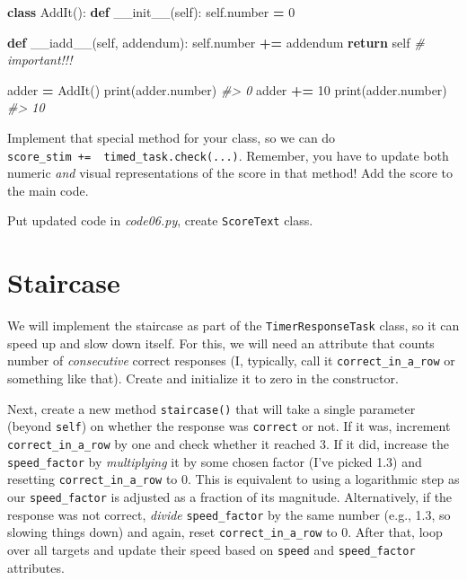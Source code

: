 \documentclass[
]{book}
\newenvironment{Shaded}{\begin{snugshade}}{\end{snugshade}}
\newcommand{\BuiltInTok}[1]{#1}
\newcommand{\CommentTok}[1]{\textcolor[rgb]{0.56,0.35,0.01}{\textit{#1}}}
\newcommand{\ControlFlowTok}[1]{\textcolor[rgb]{0.13,0.29,0.53}{\textbf{#1}}}
\newcommand{\DecValTok}[1]{\textcolor[rgb]{0.00,0.00,0.81}{#1}}
\newcommand{\FunctionTok}[1]{\textcolor[rgb]{0.00,0.00,0.00}{#1}}
\newcommand{\KeywordTok}[1]{\textcolor[rgb]{0.13,0.29,0.53}{\textbf{#1}}}
\newcommand{\NormalTok}[1]{#1}
\newcommand{\OperatorTok}[1]{\textcolor[rgb]{0.81,0.36,0.00}{\textbf{#1}}}
\newcommand{\VariableTok}[1]{\textcolor[rgb]{0.00,0.00,0.00}{#1}}
\begin{document}
\begin{Shaded}
\begin{Highlighting}[]
\KeywordTok{class}\NormalTok{ AddIt():}
    \KeywordTok{def} \FunctionTok{\_\_init\_\_}\NormalTok{(}\VariableTok{self}\NormalTok{):}
        \VariableTok{self}\NormalTok{.number }\OperatorTok{=} \DecValTok{0}
        
    \KeywordTok{def} \FunctionTok{\_\_iadd\_\_}\NormalTok{(}\VariableTok{self}\NormalTok{, addendum):}
        \VariableTok{self}\NormalTok{.number }\OperatorTok{+=}\NormalTok{ addendum}
        \ControlFlowTok{return} \VariableTok{self} \CommentTok{\# important!!!}


\NormalTok{adder }\OperatorTok{=}\NormalTok{ AddIt()}
\BuiltInTok{print}\NormalTok{(adder.number)}
\CommentTok{\#\textgreater{} 0}
\NormalTok{adder }\OperatorTok{+=} \DecValTok{10}
\BuiltInTok{print}\NormalTok{(adder.number)}
\CommentTok{\#\textgreater{} 10}
\end{Highlighting}
\end{Shaded}

Implement that special method for your class, so we can do \texttt{score\_stim\ +=\ \ timed\_task.check(...)}. Remember, you have to update both numeric \emph{and} visual representations of the score in that method! Add the score to the main code.

Put updated code in \emph{code06.py}, create \texttt{ScoreText} class.

\hypertarget{staircase}{%
\section{Staircase}\label{staircase}}

We will implement the staircase as part of the \texttt{TimerResponseTask} class, so it can speed up and slow down itself. For this, we will need an attribute that counts number of \emph{consecutive} correct responses (I, typically, call it \texttt{correct\_in\_a\_row} or something like that). Create and initialize it to zero in the constructor.

Next, create a new method \texttt{staircase()} that will take a single parameter (beyond \texttt{self}) on whether the response was \texttt{correct} or not. If it was, increment \texttt{correct\_in\_a\_row} by one and check whether it reached 3. If it did, increase the \texttt{speed\_factor} by \emph{multiplying} it by some chosen factor (I've picked 1.3) and resetting \texttt{correct\_in\_a\_row} to 0. This is equivalent to using a logarithmic step as our \texttt{speed\_factor} is adjusted as a fraction of its magnitude. Alternatively, if the response was not correct, \emph{divide} \texttt{speed\_factor} by the same number (e.g., 1.3, so slowing things down) and again, reset \texttt{correct\_in\_a\_row} to 0. After that, loop over all targets and update their speed based on \texttt{speed} and \texttt{speed\_factor} attributes.
\end{document}
